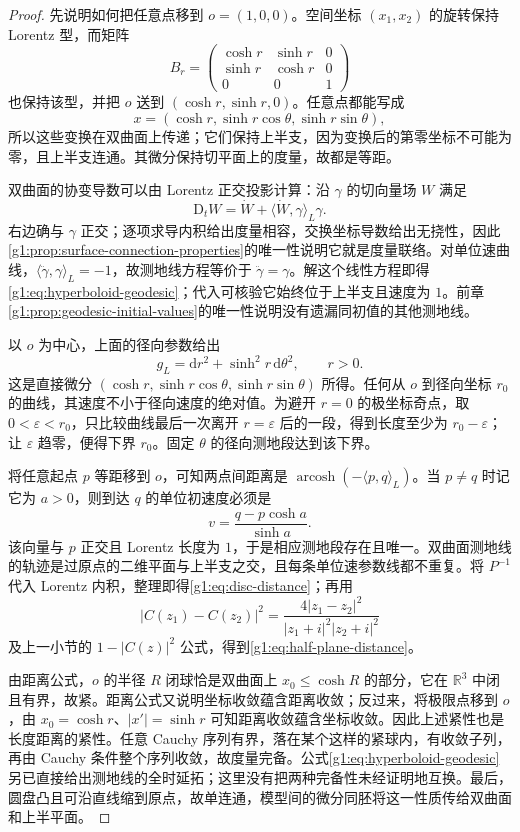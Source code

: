 \begin{proof}
	先说明如何把任意点移到 \(o=(1,0,0)\)。空间坐标 \((x_1,x_2)\) 的旋转保持 Lorentz 型，而矩阵
	\[
		B_r=\begin{pmatrix}\cosh r&\sinh r&0\\\sinh r&\cosh r&0\\0&0&1\end{pmatrix}
	\]
	也保持该型，并把 \(o\) 送到 \((\cosh r,\sinh r,0)\)。任意点都能写成
	\[
		x=(\cosh r,\sinh r\cos\theta,\sinh r\sin\theta),
	\]
	所以这些变换在双曲面上传递；它们保持上半支，因为变换后的第零坐标不可能为零，且上半支连通。其微分保持切平面上的度量，故都是等距。

	双曲面的协变导数可以由 Lorentz 正交投影计算：沿 \(\gamma\) 的切向量场 \(W\) 满足
	\[
		\mathrm{D}_tW=\dot W+\langle\dot W,\gamma\rangle_L\gamma.
	\]
	右边确与 \(\gamma\) 正交；逐项求导内积给出度量相容，交换坐标导数给出无挠性，因此\cref{g1:prop:surface-connection-properties}的唯一性说明它就是度量联络。对单位速曲线，\(\langle\ddot\gamma,\gamma\rangle_L=-1\)，故测地线方程等价于 \(\ddot\gamma=\gamma\)。解这个线性方程即得\eqref{g1:eq:hyperboloid-geodesic}；代入可核验它始终位于上半支且速度为 \(1\)。前章\cref{g1:prop:geodesic-initial-values}的唯一性说明没有遗漏同初值的其他测地线。

	以 \(o\) 为中心，上面的径向参数给出
	\begin{equation}
		\label{g1:eq:hyperbolic-polar-metric}
		g_L=\mathrm{d}r^2+\sinh^2r\,\mathrm{d}\theta^2,\qquad r>0.
	\end{equation}
	这是直接微分 \((\cosh r,\sinh r\cos\theta,\sinh r\sin\theta)\) 所得。任何从 \(o\) 到径向坐标 \(r_0\) 的曲线，其速度不小于径向速度的绝对值。为避开 \(r=0\) 的极坐标奇点，取 \(0<\varepsilon<r_0\)，只比较曲线最后一次离开 \(r=\varepsilon\) 后的一段，得到长度至少为 \(r_0-\varepsilon\)；让 \(\varepsilon\) 趋零，便得下界 \(r_0\)。固定 \(\theta\) 的径向测地段达到该下界。

	将任意起点 \(p\) 等距移到 \(o\)，可知两点间距离是 \(\operatorname{arcosh}(-\langle p,q\rangle_L)\)。当 \(p\ne q\) 时记它为 \(a>0\)，则到达 \(q\) 的单位初速度必须是
	\[
		v=\frac{q-p\cosh a}{\sinh a}.
	\]
	该向量与 \(p\) 正交且 Lorentz 长度为 \(1\)，于是相应测地段存在且唯一。双曲面测地线的轨迹是过原点的二维平面与上半支之交，且每条单位速参数线都不重复。将 \(P^{-1}\) 代入 Lorentz 内积，整理即得\eqref{g1:eq:disc-distance}；再用
	\[
		|C(z_1)-C(z_2)|^2=\frac{4|z_1-z_2|^2}{|z_1+i|^2|z_2+i|^2}
	\]
	及上一小节的 \(1-|C(z)|^2\) 公式，得到\eqref{g1:eq:half-plane-distance}。

	由距离公式，\(o\) 的半径 \(R\) 闭球恰是双曲面上 \(x_0\leq\cosh R\) 的部分，它在 \(\mathbb R^3\) 中闭且有界，故紧。距离公式又说明坐标收敛蕴含距离收敛；反过来，将极限点移到 \(o\)，由 \(x_0=\cosh r\)、\(|x'|=\sinh r\) 可知距离收敛蕴含坐标收敛。因此上述紧性也是长度距离的紧性。任意 Cauchy 序列有界，落在某个这样的紧球内，有收敛子列，再由 Cauchy 条件整个序列收敛，故度量完备。公式\eqref{g1:eq:hyperboloid-geodesic}另已直接给出测地线的全时延拓；这里没有把两种完备性未经证明地互换。最后，圆盘凸且可沿直线缩到原点，故单连通，模型间的微分同胚将这一性质传给双曲面和上半平面。
\end{proof}


